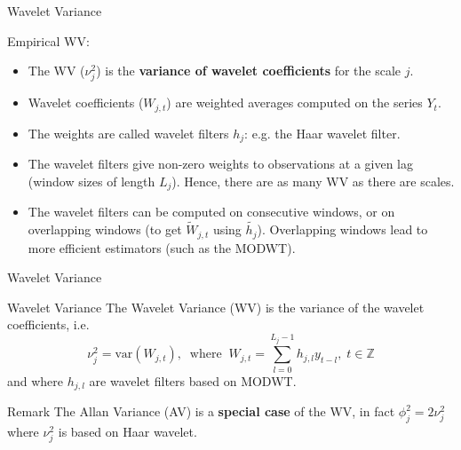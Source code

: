 \documentclass[envcountsect,usenames,dvipsnames]{beamer}
\theoremstyle{mystyle}
\begin{document}
\begin{frame}{Wavelet Variance}
	\begin{block}{Empirical WV:}
\begin{itemize}
\item The WV ($\nu_j^2$) is the \textbf{{\color{beamer@UIUCblue}variance of wavelet coefficients}} for the scale $j$.
\item Wavelet coefficients ($W_{j,t}$) are weighted averages computed on the series $Y_t$.
\item The weights are called wavelet filters $h_j$: e.g. the Haar wavelet filter.
\item The wavelet filters give non-zero weights to observations at a given lag (window sizes of length $L_j$). Hence, there are as many WV as there are scales.
\item The wavelet filters can be computed on consecutive windows, or on overlapping windows (to get $\widetilde{W}_{j,t}$ using $\tilde{h_j}$). Overlapping windows lead to more efficient estimators (such as the MODWT).
\end{itemize}
\end{block}

\end{frame}

	
\begin{frame}{Wavelet Variance}
	\begin{block}{Wavelet Variance}
The Wavelet Variance (WV) is the variance of the wavelet coefficients, i.e.
%
\begin{equation*}
 \nu_j^2 = \text{var} \left ( W_{j,t} \right ), \; \; \text{where} \; \; W_{j,t} = \sum_{l=0}^{L_j-1} h_{j,l} y_{t-l}, \;t \in \mathbb{Z}
\label{eq:WVtheo}
 \end{equation*}
%
and where $h_{j,l}$ are wavelet filters based on MODWT.
\end{block}

\begin{exampleblock}{Remark}
    The Allan Variance (AV) is a {\color{beamer@myorange}\textbf{special case}} of the WV, in fact ${\phi}^2_j = 2 \nu^2_{j}$ where $\nu^2_{j}$ is based on Haar wavelet.  
\end{exampleblock}
\end{frame}
\end{document}
